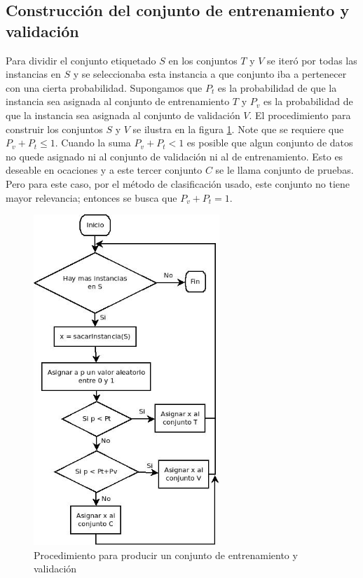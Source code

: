 \documentclass[a4paper, 11pt, oneside]{report}
\begin{document}
\subsection{Construcción del conjunto de entrenamiento y validación}
Para dividir el conjunto etiquetado $S$ en los conjuntos $T$ y $V$ se iteró por todas las instancias en $S$ y se seleccionaba esta instancia a que conjunto iba a pertenecer con una cierta probabilidad. Supongamos que $P_t$ es la probabilidad de que la instancia sea asignada al conjunto de entrenamiento $T$ y $P_v$ es la probabilidad de que la instancia sea asignada al conjunto de validación $V$. El procedimiento para construir los conjuntos $S$ y $V$ se ilustra en la figura \ref{fig:setPartition}. \newline \newline
Note que se requiere que $P_v + P_t \le 1$. Cuando la suma $P_v + P_t < 1$ es posible que algun conjunto de datos no quede asignado ni al conjunto de validación ni al de entrenamiento. Esto es deseable en ocaciones y a este tercer conjunto $C$ se le llama conjunto de pruebas. Pero para este caso, por el método de clasificación usado, este conjunto no tiene mayor relevancia; entonces se busca que $P_v + P_t = 1$.

\begin{figure}[htb]
\begin{center}
\leavevmode
\includegraphics[width=7cm]{diagrams/setPartition.jpg}
\end{center}
\caption{Procedimiento para producir un conjunto de entrenamiento y validación}
\label{fig:setPartition}
\end{figure}
\end{document}
